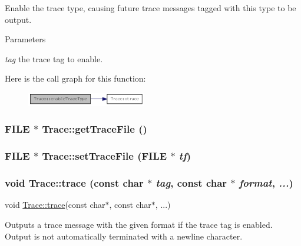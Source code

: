 Enable the trace type, causing future trace messages tagged with this type to be output.


\begin{DoxyParams}{Parameters}
\item[{\em tag}]the trace tag to enable. \end{DoxyParams}


Here is the call graph for this function:\nopagebreak
\begin{figure}[H]
\begin{center}
\leavevmode
\includegraphics[width=148pt]{classTrace_aba8fd6ff6e39496ca25050ae01800523_cgraph}
\end{center}
\end{figure}
\hypertarget{classTrace_ac0b94d02155d5b9a1bf457801cfeb120}{
\subsubsection[{getTraceFile}]{\setlength{\rightskip}{0pt plus 5cm}FILE $\ast$ Trace::getTraceFile ()}}
\label{classTrace_ac0b94d02155d5b9a1bf457801cfeb120}
\hypertarget{classTrace_a750f5adef7ebc7c23ecb0a8c90af1f85}{
\subsubsection[{setTraceFile}]{\setlength{\rightskip}{0pt plus 5cm}FILE $\ast$ Trace::setTraceFile (FILE $\ast$ {\em tf})}}
\label{classTrace_a750f5adef7ebc7c23ecb0a8c90af1f85}
\hypertarget{classTrace_a17c20d8abd43a042ac5a75e82d45047b}{
\subsubsection[{trace}]{\setlength{\rightskip}{0pt plus 5cm}void Trace::trace (const char $\ast$ {\em tag}, \/  const char $\ast$ {\em format}, \/   {\em ...})}}
\label{classTrace_a17c20d8abd43a042ac5a75e82d45047b}
void \hyperlink{classTrace_a17c20d8abd43a042ac5a75e82d45047b}{Trace::trace}(const char$\ast$, const char$\ast$, ...)

Outputs a trace message with the given format if the trace tag is enabled. Output is not automatically terminated with a newline character.


